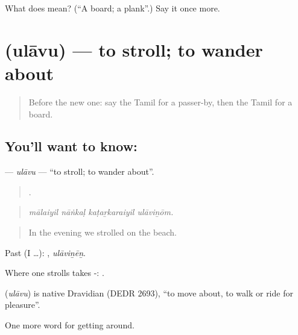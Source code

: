 \begin{tcolorbox}[breakable,colback=teal!4,colframe=teal!35!black,title={Before you move on}]
What does  mean? (\textquotedblleft{}A board; a plank\textquotedblright{}.) Say it once more.
\end{tcolorbox}
\section[\texorpdfstring{\ta{உலாவு} (ulāvu)}{உலாவு (ulāvu)}]{ (ulāvu) — to stroll; to wander about}

\label{lesson:TA-C410-ulavu}



\begin{quote}
Before the new one: say the Tamil for a passer-by, then the Tamil for a board.
\end{quote}

\subsection*{You'll want to know: }
\textbf{} — \emph{ulāvu} — \textquotedblleft{}to stroll; to wander about\textquotedblright{}.

\begin{quote}
   .
\end{quote}

\begin{quote}
\emph{mālaiyil nāṅkaḷ kaṭaṟkaraiyil ulāviṉōm.}
\end{quote}

\begin{quote}
In the evening we strolled on the beach.
\end{quote}

Past (I …): , \emph{ulāviṉēṉ}.

Where one strolls takes -:  .

\begin{cousinweb}
\textbf{} (\emph{ulāvu}) is native Dravidian (DEDR 2693), \textquotedblleft{}to move about, to walk or ride for pleasure\textquotedblright{}.
\end{cousinweb}

\begin{grammarlens}[title={What you've built}]
One more word for getting around.
\end{grammarlens}

